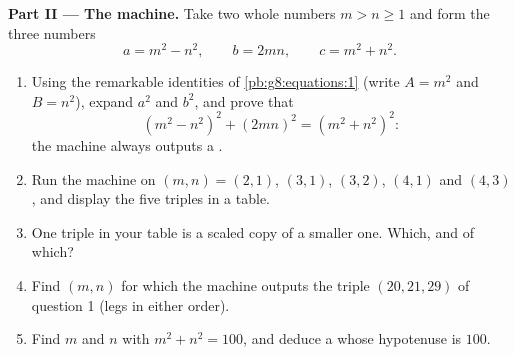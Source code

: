 \begin{problem}[{Weekend problem --- whole-number right triangles,
and the identity $(m^2 - n^2)^2 + (2mn)^2 = (m^2 + n^2)^2$ that
generates them all}]
\medskip
\noindent\textbf{Part II --- The machine.}
Take two whole numbers $m > n \geq 1$ and form the three numbers
\[
a = m^2 - n^2,
\qquad
b = 2mn,
\qquad
c = m^2 + n^2 .
\]
\begin{enumerate}[resume]
  \item Using the remarkable identities of
        \cref{pb:g8:equations:1} (write $A = m^2$ and $B = n^2$),
        expand $a^2$ and $b^2$, and prove that
        \[
        \left(m^2 - n^2\right)^2 + (2mn)^2
        = \left(m^2 + n^2\right)^2 :
        \]
        the machine always outputs a .
  \item Run the machine on $(m, n) = (2, 1)$, $(3, 1)$, $(3, 2)$,
        $(4, 1)$ and $(4, 3)$, and display the five triples in a
        table.
  \item One triple in your table is a scaled copy of a smaller
        one. Which, and of which?
  \item Find $(m, n)$ for which the machine outputs the triple
        $(20, 21, 29)$ of question 1 (legs in either order).
  \item Find $m$ and $n$ with $m^2 + n^2 = 100$, and deduce a
         whose hypotenuse is $100$.
\end{enumerate}


\end{problem}

